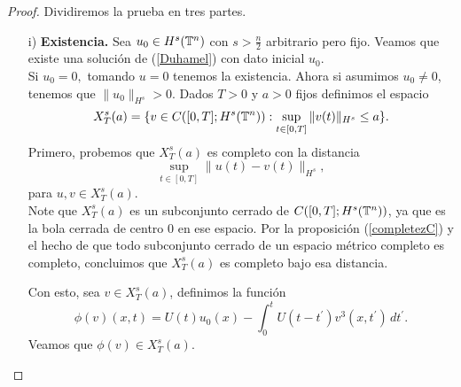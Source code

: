 \begin{proof}
Dividiremos la prueba en tres partes.
\begin{itemize}
       \item[i)]\textbf{Existencia.} Sea $u_0\in H^s(\mathbb{T}^n)$ con $s>\frac{n}{2}$ arbitrario pero fijo. Veamos que existe una solución de (\ref{Duhamel}) con dato inicial $u_0.$\\
        Si $u_0=0,$ tomando $u=0$ tenemos la existencia. Ahora si asumimos $u_0\neq 0$, tenemos que $\|u_0\|_{H^s}>0.$ Dados $T>0$ y $a>0$ fijos definimos el espacio
       $$X_T^s(a)=\{v\in C([0,T];H^s(\mathbb{T}^n)):\sup_{t\in[0,T]}\|v(t)\|_{H^s}\leq a\}.$$
       Primero, probemos que $X_T^s(a)$ es completo con la distancia
       $$\sup_{t\in[0,T]}\|u(t)-v(t)\|_{H^s},$$
       para $u,v\in X^s_T(a)$.\\

       Note que $X^s_T(a)$ es un subconjunto cerrado de $C([0,T];H^s(\mathbb{T}^n))$, ya que es la bola cerrada de centro $0$ en ese espacio. Por la proposición (\ref{completezC}) y el hecho de que todo subconjunto cerrado de un espacio métrico completo es completo, concluimos que $X^s_T(a)$ es completo bajo esa distancia.

       Con esto, sea $v\in X^s_T(a)$, definimos la función
       $$\phi(v)(x,t)=U(t)u_0(x)-\int_0^tU(t-t^\prime)v^3(x,t^\prime)\,dt^\prime.$$
       Veamos que $\phi(v)\in X^s_T(a).$ 


\end{itemize}
\end{proof}
